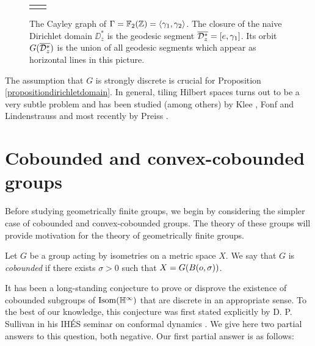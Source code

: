 \begin{figure}
\begin{center}
\begin{tabular}{@{}ll@{}}
\begin{tikzpicture}[line cap=round,line join=round,>=triangle 45,scale=0.45]
\end{tikzpicture}
\end{tabular}
\caption[The Cayley graph of $\Gamma = \F_2(\Z) = \lb \gamma_1,\gamma_2\rb$]{The Cayley graph of $\Gamma = \F_2(\Z) = \lb \gamma_1,\gamma_2\rb$. The closure of the naive Dirichlet domain $\DD_z^*$ is the geodesic segment $\overline{\mathcal D_z^*} = [e,\gamma_1]$. Its orbit $G(\overline{\mathcal D_z^*})$ is the union of all geodesic segments which appear as horizontal lines in this picture.}
\label{figurefree2}
\end{center}
\end{figure}


\begin{remark}
The assumption that $G$ is strongly discrete is crucial for Proposition \ref{propositiondirichletdomain}. In general, tiling Hilbert spaces turns out to be a very subtle problem and has been studied (among others) by Klee \cite{Klee1,Klee2}, Fonf and Lindenstrauss \cite{FonfLindenstrauss} and most recently by Preiss \cite{Preiss}.
\end{remark}



\bigskip
\section{Cobounded and convex-cobounded groups}
\label{subsectionCBCCB}

Before studying geometrically finite groups, we begin by considering the simpler case of cobounded and convex-cobounded groups. The theory of these groups will provide motivation for the theory of geometrically finite groups.

\begin{definition}
\label{definitionCB}
Let $G$ be a group acting by isometries on a metric space $X$. We say that $G$ is \emph{cobounded} if there exists $\sigma > 0$ such that $X = G(B(o,\sigma))$.
\end{definition}

It has been a long-standing conjecture to prove or disprove the existence of cobounded subgroups of $\Isom(\H^\infty)$ that are discrete in an appropriate sense. To the best of our knowledge, this conjecture was first stated explicitly by D. P. Sullivan in his IH\'ES seminar on conformal dynamics \cite[p.17]{Sullivan_seminar}. We give here two partial answers to this question, both negative. Our first partial answer is as follows:

